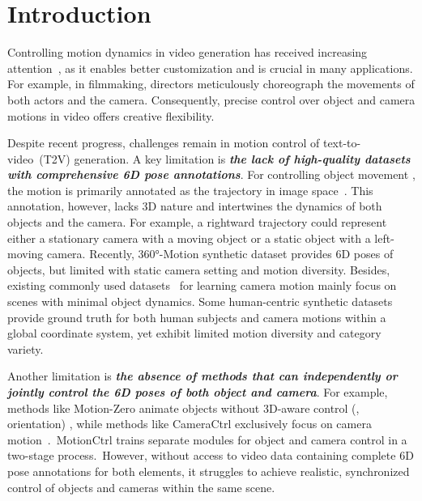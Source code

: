 \vspace{-3mm}
\section{Introduction}
\label{sec:intro}
\vspace{-0.6mm}



Controlling motion dynamics in video generation has received increasing attention~\cite{CameraCtrl,MotionCtrl,HumanVid,AnimateDiff,VMC,STDF,MotionClone,DreamMotion,MotionInversion,MotionMaster,shuai2024survey}, as it enables better customization and is crucial in many applications. For example, in filmmaking, directors meticulously choreograph the movements of both actors and the camera.
Consequently, precise control over object and camera motions in video offers creative flexibility.





Despite recent progress, challenges remain in motion control of text-to-video~(T2V) generation. A key limitation is \textit{\textbf{the lack of high-quality datasets with comprehensive 6D pose annotations}}.
For controlling object movement \cite{MotionCtrl,AnyI2V,VideoComposer,DragNUWA,Tora,Trailblazer,FreeTraj,Motion-Zero,MotionBooth,Image-Conductor,Motion-I2V}, the motion is primarily annotated as the trajectory in image space~\cite{MotionCtrl,DragNUWA}. This annotation, however, lacks 3D nature and intertwines the dynamics of both objects and the camera. For example, a rightward trajectory could represent either a stationary camera with a moving object or a static object with a left-moving camera. Recently, \ang{360}-Motion synthetic dataset \cite{3DTrajMaster} provides 6D poses of objects, but limited with static camera setting and motion diversity.
Besides, existing commonly used datasets~\cite{Direct-A-Video,RealEstate-10K,MVImageNet} for learning camera motion mainly focus on scenes with minimal object dynamics.
Some human-centric synthetic datasets \cite{HumanVid,BEDLAM,SynBody,WHAC} provide ground truth for both human subjects and camera motions within a global coordinate system, yet exhibit limited motion diversity and category variety. 

Another limitation is \textbf{\textit{the absence of methods that can independently or jointly control the 6D poses of both object and camera}}. For example, methods like Motion-Zero \cite{Motion-Zero} animate objects without 3D-aware control (\eg, orientation) \cite{PEEKABOO,MotionBooth,Trailblazer}, while methods like CameraCtrl \cite{CameraCtrl} exclusively focus on camera motion~\cite{Training-free-CC,CamCo,VD3D}.~MotionCtrl \cite{MotionCtrl} trains separate modules for object and camera control in a two-stage process.~However, without access to video data containing complete 6D pose annotations for both elements, it struggles to achieve realistic, synchronized control of objects and cameras within the same scene.

